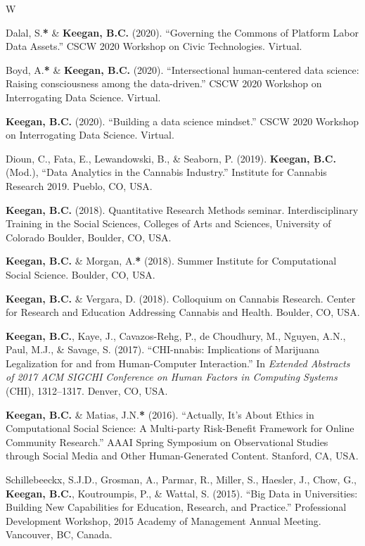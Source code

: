 \documentclass{cv}
\begin{document}
\begin{entries}{W}
		\item Dalal, S.\textbf{*} \& \textbf{Keegan, B.C.} (2020). ``Governing the Commons of Platform Labor Data Assets.'' CSCW 2020 Workshop on Civic Technologies. Virtual.
		\item Boyd, A.\textbf{*} \& \textbf{Keegan, B.C.} (2020). ``Intersectional human-centered data science: Raising consciousness among the data-driven.'' CSCW 2020 Workshop on Interrogating Data Science. Virtual.
		\item \textbf{Keegan, B.C.} (2020). ``Building a data science mindset.'' CSCW 2020 Workshop on Interrogating Data Science. Virtual.
		\item Dioun, C., Fata, E., Lewandowski, B., \& Seaborn, P. (2019). \textbf{Keegan, B.C.} (Mod.), ``Data Analytics in the Cannabis Industry.'' Institute for Cannabis Research 2019. Pueblo, CO, USA.
		\item \textbf{Keegan, B.C.} (2018). Quantitative Research Methods seminar. Interdisciplinary Training in the Social Sciences, Colleges of Arts and Sciences, University of Colorado Boulder, Boulder, CO, USA.
		\item \textbf{Keegan, B.C.} \& Morgan, A.\textbf{*} (2018). Summer Institute for Computational Social Science. Boulder, CO, USA.
		\item \textbf{Keegan, B.C.} \& Vergara, D. (2018). Colloquium on Cannabis Research. Center for Research and Education Addressing Cannabis and Health. Boulder, CO, USA.
		\item \textbf{Keegan, B.C.}, Kaye, J., Cavazos-Rehg, P., de Choudhury, M., Nguyen, A.N., Paul, M.J., \& Savage, S. (2017). ``CHI-nnabis: Implications of Marijuana Legalization for and from Human-Computer Interaction.'' In \textit{Extended Abstracts of 2017 ACM SIGCHI Conference on Human Factors in Computing Systems} (CHI), 1312--1317. Denver, CO, USA. 
		\item \textbf{Keegan, B.C.} \& Matias, J.N.\textbf{*} (2016). ``Actually, It's About Ethics in Computational Social Science: A Multi-party Risk-Benefit Framework for Online Community Research.'' AAAI Spring Symposium on Observational Studies through Social Media and Other Human-Generated Content. Stanford, CA, USA.
		\item Schillebeeckx, S.J.D., Grosman, A., Parmar, R., Miller, S., Haesler, J., Chow, G., \textbf{Keegan, B.C.}, Koutroumpis, P., \& Wattal, S. (2015). ``Big Data in Universities: Building New Capabilities for Education, Research, and Practice.'' Professional Development Workshop, 2015 Academy of Management Annual Meeting. Vancouver, BC, Canada.

\end{entries}
\end{document}
